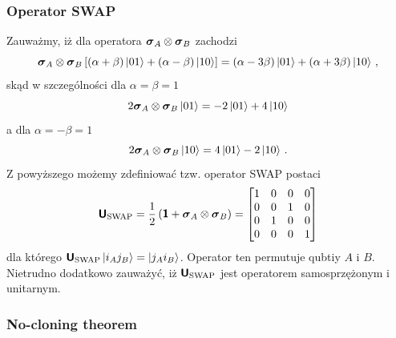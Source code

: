 \documentclass{myclass}
\begin{document}
\subsubsection*{Operator SWAP}

Zauważmy, iż dla operatora \(\boldsymbol{\mathsf{\sigma}}_A \otimes \boldsymbol{\mathsf{\sigma}}_B\) zachodzi
\begin{equation*}
    \boldsymbol{\mathsf{\sigma}}_A \otimes \boldsymbol{\mathsf{\sigma}}_B\left[(\alpha + \beta)\ket{01} + (\alpha - \beta)\ket{10}\right] = (\alpha - 3\beta)\ket{01} + (\alpha + 3\beta)\ket{10}\,,
\end{equation*}
skąd w szczególności dla \(\alpha = \beta = 1\)
\begin{equation*}
   2 \boldsymbol{\mathsf{\sigma}}_A \otimes \boldsymbol{\mathsf{\sigma}}_B \ket{01} = -2 \ket{01} + 4 \ket{10}
\end{equation*}
a dla \(\alpha = -\beta = 1\)
\begin{equation*}
    2 \boldsymbol{\mathsf{\sigma}}_A \otimes \boldsymbol{\mathsf{\sigma}}_B \ket{10} = 4 \ket{01} - 2 \ket{10}\,.
\end{equation*}
Z powyższego możemy zdefiniować tzw. operator SWAP postaci
\begin{equation*}
    \oper{U}_\text{SWAP} = \frac{1}{2}\left(\oper{1} + \oper{\sigma}_A \otimes \oper{\sigma}_B \right) = \mqty[1 & 0 & 0 & 0\\ 0 & 0 & 1 & 0 \\ 0 & 1 & 0 & 0 \\ 0 & 0 & 0 & 1]
\end{equation*}
dla którego \(\boldsymbol{\mathsf{U}}_\text{SWAP}\ket{i_Aj_B} = \ket{j_Ai_B}\). Operator ten permutuje qubtiy \(A\)
i \(B\). Nietrudno dodatkowo zauważyć, iż \(\boldsymbol{\mathsf{U}}_\text{SWAP}\) jest operatorem samosprzężonym i
unitarnym.

\subsubsection{No-cloning theorem}
\end{document}
